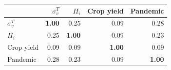 \begin{tabular}{lrrrr}
\toprule
 & $\sigma_v^T$ & $H_i$ & Crop yield & Pandemic \\
\midrule
$\sigma_v^T$ & \textbf{1.00} & 0.25 & 0.09 & 0.28 \\
$H_i$ & 0.25 & \textbf{1.00} & -0.09 & 0.23 \\
Crop yield & 0.09 & -0.09 & \textbf{1.00} & 0.09 \\
Pandemic & 0.28 & 0.23 & 0.09 & \textbf{1.00} \\
\bottomrule
\end{tabular}
